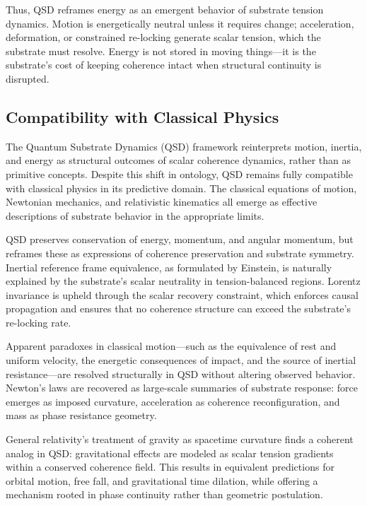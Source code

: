 \documentclass[entropy,article,submit,pdftex,moreauthors]{Definitions/mdpi}
\begin{document}
Thus, QSD reframes energy as an emergent behavior of substrate tension dynamics. Motion is energetically neutral unless it requires change; acceleration, deformation, or constrained re-locking generate scalar tension, which the substrate must resolve. Energy is not stored in moving things---it is the substrate’s cost of keeping coherence intact when structural continuity is disrupted.

\subsection{Compatibility with Classical Physics}

The Quantum Substrate Dynamics (QSD) framework reinterprets motion, inertia, and energy as structural outcomes of scalar coherence dynamics, rather than as primitive concepts. Despite this shift in ontology, QSD remains fully compatible with classical physics in its predictive domain. The classical equations of motion, Newtonian mechanics, and relativistic kinematics all emerge as effective descriptions of substrate behavior in the appropriate limits.

QSD preserves conservation of energy, momentum, and angular momentum, but reframes these as expressions of coherence preservation and substrate symmetry. Inertial reference frame equivalence, as formulated by Einstein, is naturally explained by the substrate’s scalar neutrality in tension-balanced regions. Lorentz invariance is upheld through the scalar recovery constraint, which enforces causal propagation and ensures that no coherence structure can exceed the substrate’s re-locking rate.

Apparent paradoxes in classical motion---such as the equivalence of rest and uniform velocity, the energetic consequences of impact, and the source of inertial resistance---are resolved structurally in QSD without altering observed behavior. Newton’s laws are recovered as large-scale summaries of substrate response: force emerges as imposed curvature, acceleration as coherence reconfiguration, and mass as phase resistance geometry.

General relativity’s treatment of gravity as spacetime curvature finds a coherent analog in QSD: gravitational effects are modeled as scalar tension gradients within a conserved coherence field. This results in equivalent predictions for orbital motion, free fall, and gravitational time dilation, while offering a mechanism rooted in phase continuity rather than geometric postulation.
\end{document}
